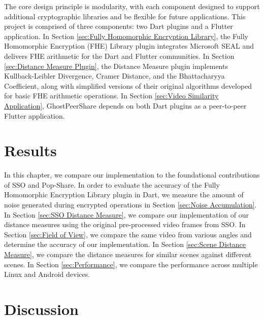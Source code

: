 \documentclass [11pt, proquest] {uwthesis}[2020/02/24]
\begin{document}
The core design principle is modularity, with each component designed to support additional cryptographic libraries and be flexible for future applications. This project is comprised of three components: two Dart plugins and a Flutter application. In Section \ref{sec:Fully Homomorphic Encryption Library}, the Fully Homomorphic Encryption (FHE) Library plugin integrates Microsoft SEAL and delivers FHE arithmetic for the Dart and Flutter communities. In Section \ref{sec:Distance Measure Plugin}, the Distance Measure plugin implements Kullback-Leibler Divergence, Cramer Distance, and the Bhattacharyya Coefficient, along with simplified versions of their original algorithms developed for basic FHE arithmetic operations. In Section \ref{sec:Video Similarity Application}, GhostPeerShare depends on both Dart plugins as a peer-to-peer Flutter application.






\chapter{Results}

In this chapter, we compare our implementation to the foundational contributions of SSO and Pop-Share. In order to evaluate the accuracy of the Fully Homomorphic Encryption Library plugin in Dart, we measure the amount of noise generated during encrypted operations in Section \ref{sec:Noise Accumulation}. In Section \ref{sec:SSO Distance Measure}, we compare our implementation of our distance measures using the original pre-processed video frames from SSO. In Section \ref{sec:Field of View}, we compare the same video from various angles and determine the accuracy of our implementation. In Section \ref{sec:Scene Distance Measure}, we compare the distance measures for similar scenes against different scenes. In Section \ref{sec:Performance}, we compare the performance across multiple Linux and Android devices.








\chapter{Discussion}

\end{document}
